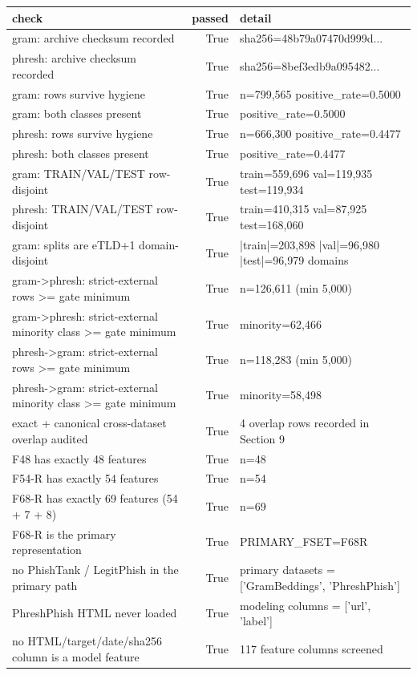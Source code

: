 \begin{tabular}{lrl}
\toprule
check & passed & detail \\
\midrule
gram: archive checksum recorded & True & sha256=48b79a07470d999d... \\
phresh: archive checksum recorded & True & sha256=8bef3edb9a095482... \\
gram: rows survive hygiene & True & n=799,565  positive\_rate=0.5000 \\
gram: both classes present & True & positive\_rate=0.5000 \\
phresh: rows survive hygiene & True & n=666,300  positive\_rate=0.4477 \\
phresh: both classes present & True & positive\_rate=0.4477 \\
gram: TRAIN/VAL/TEST row-disjoint & True & train=559,696 val=119,935 test=119,934 \\
phresh: TRAIN/VAL/TEST row-disjoint & True & train=410,315 val=87,925 test=168,060 \\
gram: splits are eTLD+1 domain-disjoint & True & |train|=203,898 |val|=96,980 |test|=96,979 domains \\
gram->phresh: strict-external rows >= gate minimum & True & n=126,611 (min 5,000) \\
gram->phresh: strict-external minority class >= gate minimum & True & minority=62,466 \\
phresh->gram: strict-external rows >= gate minimum & True & n=118,283 (min 5,000) \\
phresh->gram: strict-external minority class >= gate minimum & True & minority=58,498 \\
exact + canonical cross-dataset overlap audited & True & 4 overlap rows recorded in Section 9 \\
F48 has exactly 48 features & True & n=48 \\
F54-R has exactly 54 features & True & n=54 \\
F68-R has exactly 69 features (54 + 7 + 8) & True & n=69 \\
F68-R is the primary representation & True & PRIMARY\_FSET=F68R \\
no PhishTank / LegitPhish in the primary path & True & primary datasets = ['GramBeddings', 'PhreshPhish'] \\
PhreshPhish HTML never loaded & True & modeling columns = ['url', 'label'] \\
no HTML/target/date/sha256 column is a model feature & True & 117 feature columns screened \\
\bottomrule
\end{tabular}
